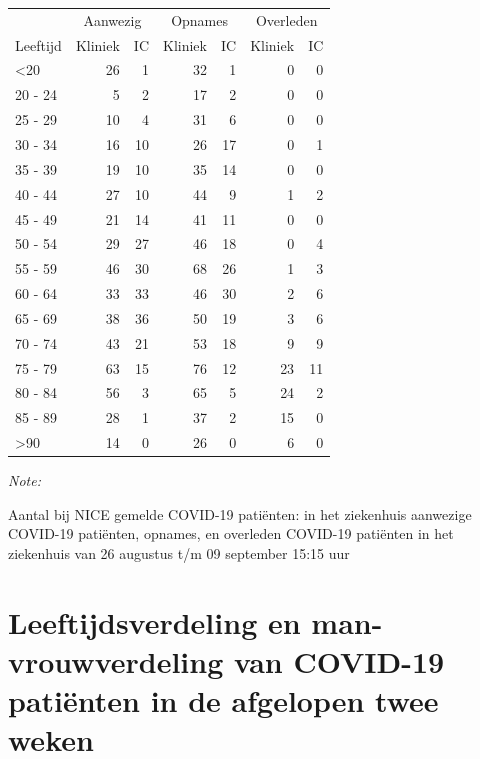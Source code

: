 \documentclass[
  english,
  man,floatsintext]{apa6}
\begin{document}
\begin{table}
\centering\begingroup\fontsize{10}{12}\selectfont

\begin{threeparttable}
\begin{tabular}{lrrrrrr}
\toprule
\multicolumn{1}{c}{ } & \multicolumn{2}{c}{Aanwezig} & \multicolumn{2}{c}{Opnames} & \multicolumn{2}{c}{Overleden} \\
\cmidrule(l{3pt}r{3pt}){2-3} \cmidrule(l{3pt}r{3pt}){4-5} \cmidrule(l{3pt}r{3pt}){6-7}
Leeftijd & Kliniek & IC & Kliniek & IC & Kliniek & IC\\
\midrule
<20 & 26 & 1 & 32 & 1 & 0 & 0\\
20 - 24 & 5 & 2 & 17 & 2 & 0 & 0\\
25 - 29 & 10 & 4 & 31 & 6 & 0 & 0\\
30 - 34 & 16 & 10 & 26 & 17 & 0 & 1\\
35 - 39 & 19 & 10 & 35 & 14 & 0 & 0\\
40 - 44 & 27 & 10 & 44 & 9 & 1 & 2\\
45 - 49 & 21 & 14 & 41 & 11 & 0 & 0\\
50 - 54 & 29 & 27 & 46 & 18 & 0 & 4\\
55 - 59 & 46 & 30 & 68 & 26 & 1 & 3\\
60 - 64 & 33 & 33 & 46 & 30 & 2 & 6\\
65 - 69 & 38 & 36 & 50 & 19 & 3 & 6\\
70 - 74 & 43 & 21 & 53 & 18 & 9 & 9\\
75 - 79 & 63 & 15 & 76 & 12 & 23 & 11\\
80 - 84 & 56 & 3 & 65 & 5 & 24 & 2\\
85 - 89 & 28 & 1 & 37 & 2 & 15 & 0\\
>90 & 14 & 0 & 26 & 0 & 6 & 0\\
\bottomrule
\end{tabular}
\begin{tablenotes}
\item \textit{Note: } 
\item Aantal bij NICE gemelde COVID-19 patiënten: in het ziekenhuis aanwezige COVID-19 patiënten, opnames, en overleden COVID-19 patiënten in het ziekenhuis van 26 augustus t/m 09 september 15:15 uur
\end{tablenotes}
\end{threeparttable}
\endgroup{}
\end{table}

\newpage

\hypertarget{leeftijdsverdeling-en-man-vrouwverdeling-van-covid-19-patiuxebnten-in-de-afgelopen-twee-weken}{%
\section{Leeftijdsverdeling en man-vrouwverdeling van COVID-19 patiënten in de afgelopen twee weken}\label{leeftijdsverdeling-en-man-vrouwverdeling-van-covid-19-patiuxebnten-in-de-afgelopen-twee-weken}}
\end{document}
